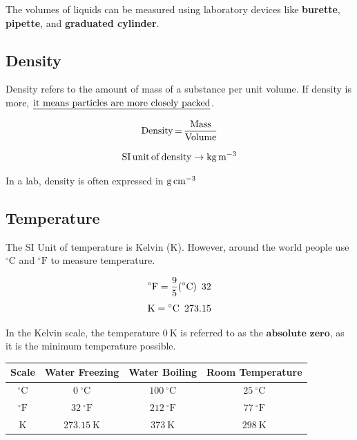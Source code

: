 \documentclass[
  14pt,
]{extarticle}
\renewenvironment{quote}{\begin{myquote}}{\end{myquote}}
\begin{document}
The volumes of liquids can be measured using laboratory devices like
\textbf{burette}, \textbf{pipette}, and \textbf{graduated cylinder}.

\hypertarget{density}{%
\subsection{Density}\label{density}}

Density refers to the amount of mass of a substance per unit volume. If
density is more,
\(\text{\underline{it means particles are more closely packed}}\).

\[{\mathrm{Density}\mkern3mu \mathrm{=}\mkern3mu \mathrm{\frac{Mass}{Volume}}}\]

\[{\mathrm{SI}\mkern3mu \mathrm{unit}\mkern3mu \mathrm{of}\mkern3mu \mathrm{density\rightarrow kg}\mkern3mu \mathrm{m^{-3}}}\]

In a lab, density is often expressed in
\({\mathrm{g}\mkern3mu \mathrm{cm^{-3}}}\)

\hypertarget{temperature}{%
\subsection{Temperature}\label{temperature}}

The SI Unit of temperature is Kelvin (\({\mathrm{K}}\)). However, around
the world people use \({\mathrm{{}^{\circ}C}}\) and
\({\mathrm{{}^{\circ}F}}\) to measure temperature.

\[{\mathrm{{}^{\circ}F=\frac{9}{5}({}^{\circ}C)}\mkern3mu \mkern3mu \mkern3mu \mathrm{32}}\]
\[{\mathrm{K={}^{\circ}C}\mkern3mu \mkern3mu \mkern3mu \mathrm{273.15}}\]

\begin{quote}
In the Kelvin scale, the temperature \({0~\mathrm{K}}\) is referred to
as the \(\textbf{absolute zero}\), as it is the minimum temperature
possible.
\end{quote}

\begin{longtable}[]{@{}cccc@{}}
\toprule()
\textbf{Scale} & \textbf{Water Freezing} & \textbf{Water Boiling} &
\textbf{Room Temperature} \\
\midrule()
\endhead
\({\mathrm{{}^{\circ}C}}\) & \({0~\mathrm{{}^{\circ}C}}\) &
\({100~\mathrm{{}^{\circ}C}}\) & \({25~\mathrm{{}^{\circ}C}}\) \\
\({\mathrm{{}^{\circ}F}}\) & \({32~\mathrm{{}^{\circ}F}}\) &
\({212~\mathrm{{}^{\circ}F}}\) & \({77~\mathrm{{}^{\circ}F}}\) \\
\({\mathrm{K}}\) & \({273.15~\mathrm{K}}\) & \({373~\mathrm{K}}\) &
\({298~\mathrm{K}}\) \\
\bottomrule()
\end{longtable}
\end{document}
